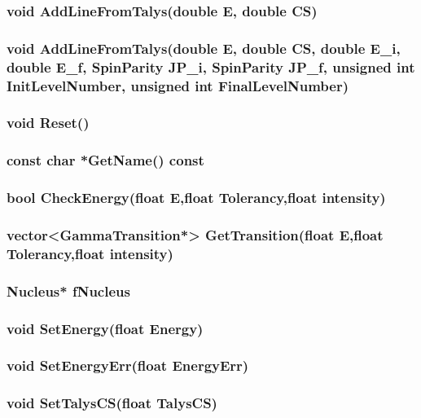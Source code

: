 \documentclass[a4paper,12pt]{extarticle}
\begin{document}
\subsubsection{void AddLineFromTalys(double E, double CS)}

\subsubsection{void AddLineFromTalys(double E, double CS, double E\_i, double E\_f, SpinParity JP\_i, SpinParity JP\_f, unsigned int InitLevelNumber, unsigned int FinalLevelNumber)}

\subsubsection{void Reset()}

\subsubsection{const char *GetName()  const}

\subsubsection{bool CheckEnergy(float E,float Tolerancy,float intensity)}

\subsubsection{vector<GammaTransition*> GetTransition(float E,float Tolerancy,float intensity)}
\subsubsection{Nucleus* fNucleus}

\subsubsection{void SetEnergy(float Energy)} 

\subsubsection{void SetEnergyErr(float EnergyErr)} 

\subsubsection{void SetTalysCS(float TalysCS)} 
\end{document}
